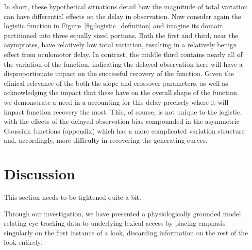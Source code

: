 In short, these hypothetical situations detail how the magnitude of total variation can have differential effects on the delay in observation. Now consider again the logistic function in Figure~\ref{fig:logistic_definition} and imagine its domain partitioned into three equally sized portions. Both the first and third, near the asymptotes, have relatively low total variation, resulting in a relatively benign effect from oculomotor delay. In contrast, the middle third contains nearly all of the variation of the function, indicating the delayed observation here will have a disproportionate impact on the successful recovery of the function. Given the clinical relevance of the both the slope and crossover parameters, as well as acknowledging the impact that these have on the overall shape of the function, we demonstrate a need in a accounting for this delay precisely where it will impact function recovery the most. This, of course, is not unique to the logistic, with the effects of the delayed observation bias compounded in the asymmetric Gaussian functions (appendix) which has a more complicated variation structure and, accordingly, more difficulty in recovering the generating curves.


\section{Discussion}

This section needs to be tightened quite a bit.

Through our investigation, we have presented a physiologically grounded model relating eye tracking data to underlying lexical access by placing emphasis singularly on the first instance of a look, discarding information on the rest of the look entirely. 

